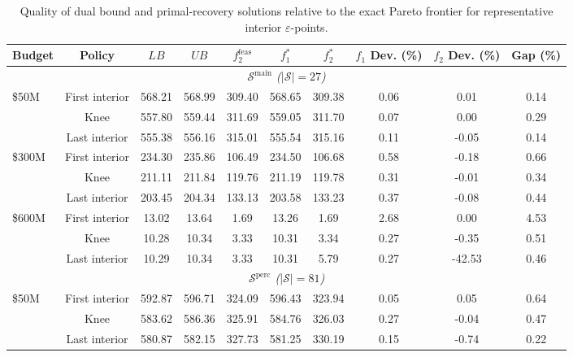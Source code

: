 \documentclass[preprint,11pt,authoryear]{elsarticle}
\begin{document}
\begin{table}[!t]
\centering
\small
\setlength{\tabcolsep}{3pt}
\renewcommand{\arraystretch}{1.1}
\caption{Quality of dual bound and primal-recovery solutions relative to the exact Pareto frontier for representative interior $\varepsilon$-points.}
\label{tbl:ld_quality}
\begin{tabular}{lccccccccc}
\toprule
Budget 
& Policy
& $LB$
& $UB$
& $f_2^{\text{feas}}$
& $f_1^{*}$
& $f_2^{*}$
& $f_1$ Dev. (\%)
& $f_2$ Dev. (\%)
& Gap (\%) \\
\midrule

\multicolumn{10}{c}{\textit{$\mathcal{S}^{\text{main}}$ ($|\mathcal{S}|=27$)}} \\
\midrule

\multirow{3}{*}{\$50M}
& First interior & 568.21 & 568.99 & 309.40 & 568.65 & 309.38 & 0.06 & 0.01 & 0.14 \\
& Knee           & 557.80 & 559.44 & 311.69 & 559.05 & 311.70 & 0.07 & 0.00 & 0.29 \\
& Last interior  & 555.38 & 556.16 & 315.01 & 555.54 & 315.16 & 0.11 & -0.05 & 0.14 \\

\midrule
\multirow{3}{*}{\$300M}
& First interior & 234.30 & 235.86 & 106.49 & 234.50 & 106.68 & 0.58 & -0.18 & 0.66 \\
& Knee           & 211.11 & 211.84 & 119.76 & 211.19 & 119.78 & 0.31 & -0.01 & 0.34 \\
& Last interior  & 203.45 & 204.34 & 133.13 & 203.58 & 133.23 & 0.37 & -0.08 & 0.44 \\

\midrule
\multirow{3}{*}{\$600M}
& First interior & 13.02 & 13.64 & 1.69 & 13.26 & 1.69 & 2.68 & 0.00 & 4.53 \\
& Knee           & 10.28 & 10.34 & 3.33 & 10.31 & 3.34 & 0.27 & -0.35 & 0.51 \\
& Last interior  & 10.29 & 10.34 & 3.33 & 10.31 & 5.79 & 0.27 & -42.53 & 0.46 \\

\midrule
\multicolumn{10}{c}{\textit{$\mathcal{S}^{\text{perc}}$ ($|\mathcal{S}|=81$)}} \\
\midrule

\multirow{3}{*}{\$50M}
& First interior & 592.87 & 596.71 & 324.09 & 596.43 & 323.94 & 0.05 & 0.05 & 0.64 \\
& Knee           & 583.62 & 586.36 & 325.91 & 584.76 & 326.03 & 0.27 & -0.04 & 0.47 \\
& Last interior  & 580.87 & 582.15 & 327.73 & 581.25 & 330.19 & 0.15 & -0.74 & 0.22 \\


\end{tabular}
\end{table}
\end{document}
